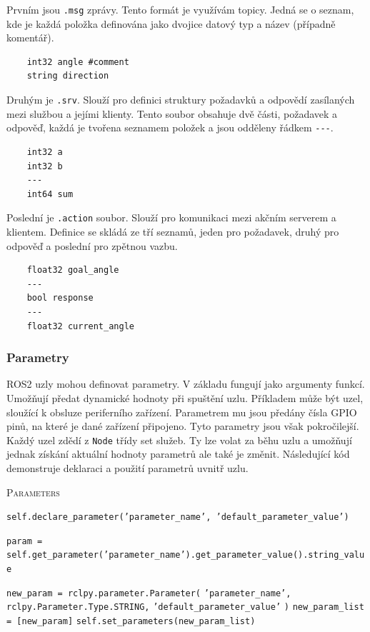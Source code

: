 Prvním jsou \verb|.msg| zprávy. Tento formát je využívám topicy. Jedná se o seznam, kde je každá položka definována jako dvojice datový typ a název (případně komentář).
\begin{verbatim}
	int32 angle #comment
	string direction
\end{verbatim}

Druhým je \verb|.srv|. Slouží pro definici struktury požadavků a odpovědí zasílaných mezi službou a jejími klienty. Tento soubor obsahuje dvě části, požadavek a odpověď, každá je tvořena seznamem položek a jsou odděleny řádkem \verb|---|. 
\begin{verbatim}
	int32 a
	int32 b
	---
	int64 sum
\end{verbatim}

Poslední je \verb|.action| soubor. Slouží pro komunikaci mezi akčním serverem a klientem. Definice se skládá ze tří seznamů, jeden pro požadavek, druhý pro odpověď a poslední pro zpětnou vazbu.
\begin{verbatim}
	float32 goal_angle
	---
	bool response
	---
	float32 current_angle
\end{verbatim}

\subsubsection*{Parametry}
ROS2 uzly mohou definovat parametry. V základu fungují jako argumenty funkcí. Umožňují předat dynamické hodnoty při spuštění uzlu. Příkladem může být uzel, sloužící k obsluze periferního zařízení. Parametrem mu jsou předány čísla GPIO pinů, na které je dané zařízení připojeno. Tyto parametry jsou však pokročilejší. Každý uzel zdědí z \verb|Node| třídy set služeb. Ty lze volat za běhu uzlu a umožňují jednak získání aktuální hodnoty parametrů ale také je změnit. Následující kód demonstruje deklaraci a použití parametrů uvnitř uzlu. \cite{ros2_introduction}

\begin{algorithm}[h!]
	\label{}
	\caption{\textsc{Parameters}}
	
	\DontPrintSemicolon
	\SetAlgoNoLine
	\SetNlSty{}{}{:}
	\SetNlSkip{-1.1em}
	
	\BlankLine \Indp\Indpp
	
    \texttt{self.declare\_parameter('parameter\_name', 'default\_parameter\_value')}\;
	
	\BlankLine
	\texttt{param = self.get\_parameter('parameter\_name').get\_parameter\_value().string\_value}\;
	
	\BlankLine
	\texttt{new\_param = rclpy.parameter.Parameter(}\;
	\Indp\Indp
	\texttt{'parameter\_name',}\;
	\texttt{rclpy.Parameter.Type.STRING,}\;
	\texttt{'default\_parameter\_value'}\;
	\Indm\Indm
	\texttt{)}\;
	\texttt{new\_param\_list = [new\_param]}\;
	\texttt{self.set\_parameters(new\_param\_list)}\;

\end{algorithm}

